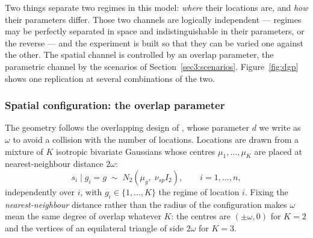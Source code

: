Two things separate two regimes in this model: \emph{where} their locations are, and \emph{how} their parameters differ. Those two channels are logically independent --- regimes may be perfectly separated in space and indistinguishable in their parameters, or the reverse --- and the experiment is built so that they can be varied one against the other. The spatial channel is controlled by an overlap parameter, the parametric channel by the scenarios of Section~\ref{sec3:scenarios}. Figure~\ref{fig:dgp} shows one replication at several combinations of the two.

\subsubsection{Spatial configuration: the overlap parameter}\label{sec3:overlap}

The geometry follows the overlapping design of \citet{MorelliMaranzanoOtto2026}, whose parameter $d$ we write as $\omega$ to avoid a collision with the number of locations. Locations are drawn from a mixture of $K$ isotropic bivariate Gaussians whose centres $\mu_1,\dots,\mu_K$ are placed at nearest-neighbour distance $2\omega$:
\begin{equation}
  s_i \mid g_i = g \;\sim\; N_2\!\left(\mu_g,\; \nu_{sp} I_2\right),
  \qquad i = 1,\dots,n ,
  \label{eq:dgpcoords}
\end{equation}
independently over $i$, with $g_i \in \{1,\dots,K\}$ the regime of location $i$. Fixing the \emph{nearest-neighbour} distance rather than the radius of the configuration makes $\omega$ mean the same degree of overlap whatever $K$: the centres are $(\pm\omega,0)$ for $K=2$ and the vertices of an equilateral triangle of side $2\omega$ for $K=3$.

